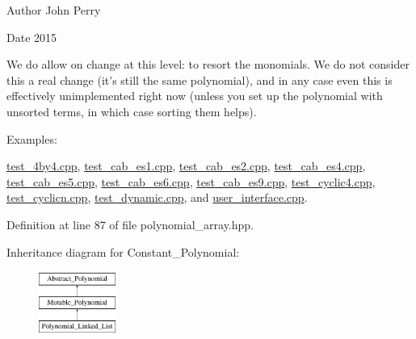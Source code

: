 \begin{DoxyAuthor}{Author}
John Perry 
\end{DoxyAuthor}
\begin{DoxyDate}{Date}
2015
\end{DoxyDate}
We do allow on change at this level\+: to resort the monomials. We do not consider this a real change (it's still the same polynomial), and in any case even this is effectively unimplemented right now (unless you set up the polynomial with unsorted terms, in which case sorting them helps). \begin{Desc}
\item[Examples\+: ]\par
\hyperlink{test_4by4_8cpp-example}{test\+\_\+4by4.\+cpp}, \hyperlink{test_cab_es1_8cpp-example}{test\+\_\+cab\+\_\+es1.\+cpp}, \hyperlink{test_cab_es2_8cpp-example}{test\+\_\+cab\+\_\+es2.\+cpp}, \hyperlink{test_cab_es4_8cpp-example}{test\+\_\+cab\+\_\+es4.\+cpp}, \hyperlink{test_cab_es5_8cpp-example}{test\+\_\+cab\+\_\+es5.\+cpp}, \hyperlink{test_cab_es6_8cpp-example}{test\+\_\+cab\+\_\+es6.\+cpp}, \hyperlink{test_cab_es9_8cpp-example}{test\+\_\+cab\+\_\+es9.\+cpp}, \hyperlink{test_cyclic4_8cpp-example}{test\+\_\+cyclic4.\+cpp}, \hyperlink{test_cyclicn_8cpp-example}{test\+\_\+cyclicn.\+cpp}, \hyperlink{test_dynamic_8cpp-example}{test\+\_\+dynamic.\+cpp}, and \hyperlink{user_interface_8cpp-example}{user\+\_\+interface.\+cpp}.\end{Desc}


Definition at line 87 of file polynomial\+\_\+array.\+hpp.

Inheritance diagram for Constant\+\_\+\+Polynomial\+:\begin{figure}[H]
\begin{center}
\leavevmode
\includegraphics[height=2.000000cm]{group__polygroup}
\end{center}
\end{figure}
